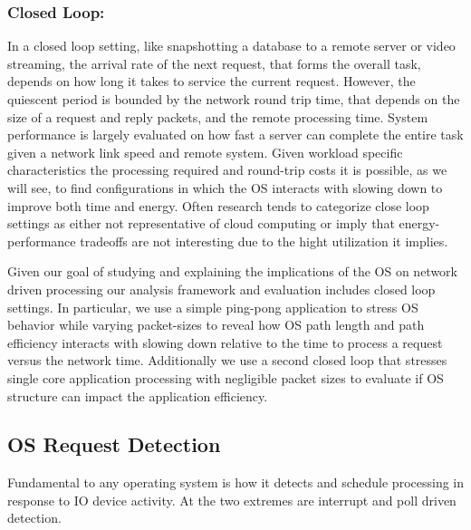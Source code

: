 \subsubsection{Closed Loop:}
In a closed loop setting, like snapshotting a database to a remote server or video streaming, the arrival rate of the next request, that forms the overall task, depends on how long it takes to service the current request.  However, the quiescent period is bounded by the network round trip time, that depends on  the size of a request and reply packets, and the remote processing time.   System performance is largely evaluated on how fast a server can complete the entire task given a network link speed and remote system.  Given workload specific characteristics the processing required and round-trip costs it is possible, as we will see, to find configurations in which the OS interacts with slowing down to improve both time and energy.   Often research tends to categorize close loop settings as either not representative of cloud computing or imply that energy-performance tradeoffs are not interesting due to the hight utilization it implies.  

Given our goal of studying and explaining the implications of the OS on network driven processing our analysis framework and evaluation includes closed loop settings.  In particular, we use a simple ping-pong application to stress OS behavior while varying packet-sizes to reveal how OS path length and path efficiency interacts with slowing down relative to the time to process a request versus the network time.  Additionally we use a second closed loop that stresses single core application processing with negligible packet sizes to evaluate if OS structure can impact the application efficiency.  

 
\subsection{OS Request Detection}

Fundamental to any operating system is how it detects and schedule processing in response to IO device activity.  At the two extremes are interrupt and poll driven detection.  

